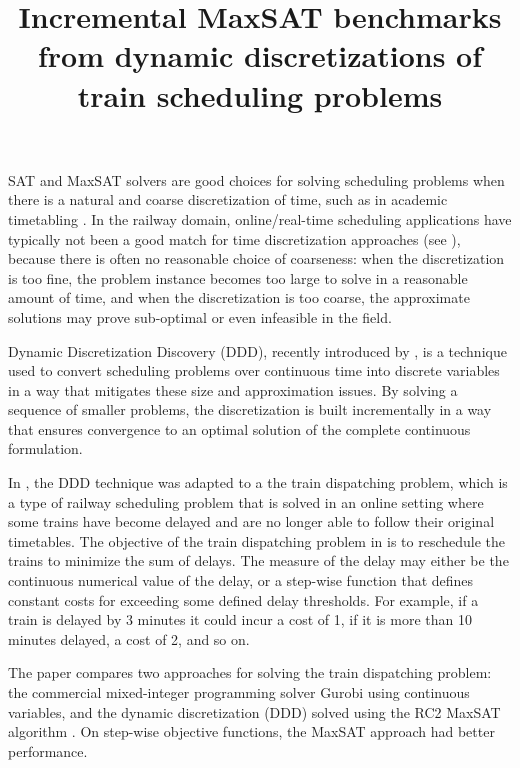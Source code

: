 \documentclass[conference]{IEEEtran}
\begin{document}
\title{Incremental MaxSAT benchmarks from dynamic discretizations of train scheduling problems}

\author{
}
\maketitle

SAT and MaxSAT solvers are good choices for solving scheduling problems when there is a
natural and coarse discretization of time, such as in academic timetabling \cite{asin2014curriculum}.
%
In the railway domain, online/real-time scheduling applications have typically not been
a good match for time discretization approaches (see \cite{mannino2009optimal, harrod2011modeling, boland2019perspectives}), because there is
often no reasonable choice of coarseness: when the discretization is too fine,
the problem instance becomes too large to solve in a reasonable amount of time, and when the discretization is
too coarse, the approximate solutions may prove sub-optimal or even infeasible
in the field.

Dynamic Discretization Discovery (DDD), recently introduced by \cite{boland2017continuous}, is a
technique used to convert scheduling problems over continuous time into
discrete variables in a way that mitigates these size and approximation issues. 
By solving a sequence of smaller problems, the discretization
is built incrementally in a way that ensures convergence to an optimal
solution of the complete continuous formulation.

In \cite{croella2024maxsat}, the DDD technique was adapted to a the train dispatching problem, which
is a type of railway scheduling problem that is solved in an online
setting where some trains have become delayed and are no longer able to follow
their original timetables.  The objective of the train dispatching problem in
\cite{croella2024maxsat} is to reschedule the trains to minimize the sum of delays.
%
The measure of the delay may either be the continuous numerical value of the
delay, or a step-wise function that defines constant  costs for exceeding some
defined delay thresholds. For example, if a train is delayed by 3 minutes it could incur
a cost of 1, if it is more than 10 minutes delayed, a cost of 2, and so on.

The paper \cite{croella2024maxsat} compares two approaches
for solving the train dispatching problem:
the commercial mixed-integer programming solver 
Gurobi using continuous variables, and
the 
dynamic discretization (DDD) solved using
 the RC2  MaxSAT algorithm \cite{IgnatievRC2}.
On step-wise objective functions, the MaxSAT approach had better performance.
\end{document}
